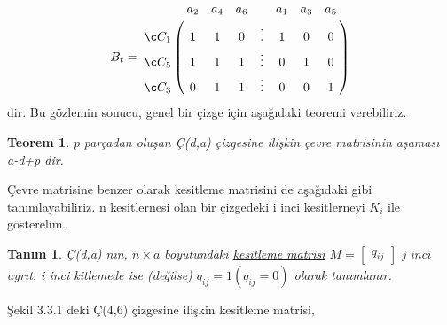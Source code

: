 \documentclass[11pt]{amsbook}
\begin{document}
\newtheorem{thm}{Teorem}[section]
\newtheorem{defn}{Tanım}[section]

\begin{align*}
	B_t = \bordermatrix{~ & a_2 & a_4&a_6& &a_1&a_3&a_5 \cr
		Ç_1 &1&  1&  0&  \vdots&1&  0&  0   \cr
		Ç_5&1 &  1 &  1&\vdots&0&  1&  0  \cr
		Ç_3 & 0 &1 & 1&\vdots &0&  0&  1\cr} \\
\end{align*}
dir. Bu gözlemin sonucu, genel bir çizge için aşağıdaki teoremi verebiliriz.\\
\begin{thm}
	p parçadan oluşan Ç(d,a) çizgesine ilişkin çevre matrisinin aşaması a-d+p dir.
\end{thm}
\hspace{1cm}Çevre matrisine benzer olarak kesitleme matrisini
de aşağıdaki gibi tanımlayabiliriz. n kesitlernesi
olan bir çizgedeki i inci kesitlerneyi
$ K_i
$
ile gösterelim.\\
\begin{defn}
	Ç(d,a) nın, 
	$n\times a 
	$
	boyutundaki \underline{kesitleme matrisi}
	$M = \begin{bmatrix}
	q_{ij}
	\end{bmatrix}
	$
	j inci ayrıt, i inci kitlemede ise (değilse)
	$q_{ij} = 1(q_{ij}  =0)
	$
	olarak tanımlanır.
\end{defn}
\hspace{1cm}Şekil 3.3.1 deki Ç(4,6) çizgesine ilişkin kesitleme matrisi,
\end{document}

